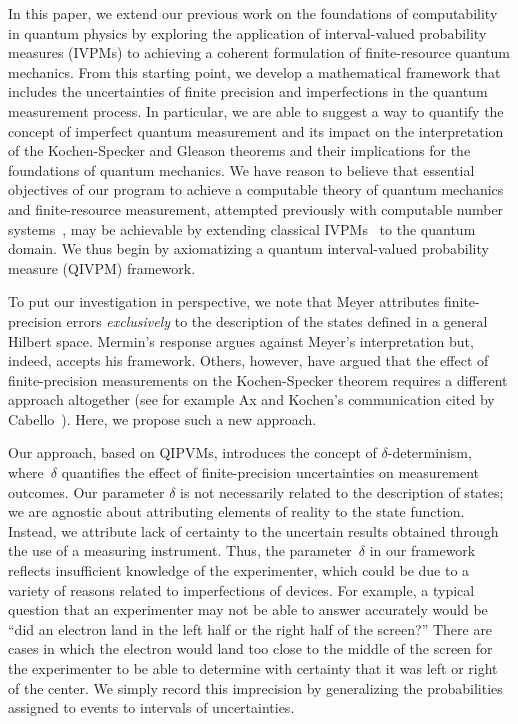 \documentclass[english,reprint, aps, prl,superscriptaddress, showpacs,
showkeys, longbibliography, amsmath, amssymb, floatfix]{revtex4-1}
\theoremstyle{plain}
\theoremstyle{definition}
\begin{document}
In this paper, we extend our previous work on the
foundations of computability in quantum physics by exploring the
application of interval-valued probability measures (IVPMs) to
achieving a coherent formulation of finite-resource quantum mechanics.
From this starting point, we develop a mathematical framework that includes the
uncertainties of finite precision and imperfections in the quantum
measurement process.  In particular, we are able to suggest a way to quantify
the concept of imperfect quantum measurement and its impact on the interpretation of
the Kochen-Specker and Gleason theorems and their implications for the
foundations of quantum mechanics.  We have reason to believe that
essential objectives of our program to achieve a computable theory of
quantum mechanics and finite-resource measurement, attempted
previously with computable number
systems~\cite{usat,geometry2013apsrev4,DQT2014}, may be achievable by
extending classical IVPMs~\cite{JamisonLodwick2004} to the quantum
domain.  We thus begin by axiomatizing a quantum interval-valued
probability measure (QIVPM) framework.

To put our investigation in perspective, we note that Meyer attributes
finite-precision errors \emph{exclusively} to the description of the
states defined in a general Hilbert space. Mermin's response argues
against Meyer's interpretation but, indeed,  accepts his framework. Others,
however, have argued that the effect of finite-precision measurements
on the Kochen-Specker theorem requires a different approach altogether
(see for example Ax and Kochen's communication cited by
Cabello~\cite{Cabello2002}). Here, we propose such a new approach. 

Our approach, based on QIPVMs, introduces the concept of $\delta$-determinism,
where~$\delta$ quantifies the effect of finite-precision uncertainties
on measurement outcomes.  Our parameter $\delta$ is not necessarily
related to the description of states; we are agnostic about
attributing elements of reality to the state function. Instead, we
attribute lack of certainty to the uncertain results obtained through
the use of a measuring instrument.  Thus, the parameter~$\delta$ in
our framework reflects insufficient knowledge of the experimenter,
which could be due to a variety of reasons related to imperfections of
devices. For example, a typical question that an experimenter may not
be able to answer accurately would be ``did an electron land in the
left half or the right half of the screen?''  There are cases in which
the electron would land too close to the middle of the screen for the
experimenter to be able to determine with certainty that it was left
or right of the center.  We simply record this imprecision by
generalizing the probabilities assigned to events to intervals of
uncertainties.
\end{document}
